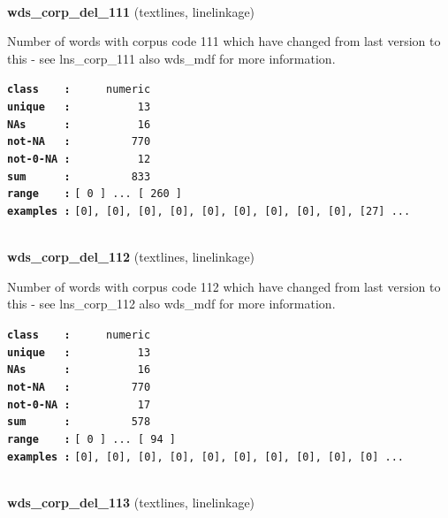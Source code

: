 \documentclass[]{article}
\begin{document}
~

\textbf{wds\_corp\_del\_111} (textlines, linelinkage)

Number of words with corpus code 111 which have changed from last
version to this - see lns\_corp\_111 also wds\_mdf for more information.

\textbf{\texttt{class\ \ \ \ :}} \texttt{~~~~~numeric}\\
\textbf{\texttt{unique\ \ \ :}} \texttt{~~~~~~~~~~13}\\
\textbf{\texttt{NAs\ \ \ \ \ \ :}} \texttt{~~~~~~~~~~16}\\
\textbf{\texttt{not-NA\ \ \ :}} \texttt{~~~~~~~~~770}\\
\textbf{\texttt{not-0-NA\ :}} \texttt{~~~~~~~~~~12}\\
\textbf{\texttt{sum\ \ \ \ \ \ :}} \texttt{~~~~~~~~~833}\\
\textbf{\texttt{range\ \ \ \ :}}
\texttt{{[}\ 0\ {]}\ ...\ {[}\ 260\ {]}}\\
\textbf{\texttt{examples\ :}}
\texttt{{[}0{]},\ {[}0{]},\ {[}0{]},\ {[}0{]},\ {[}0{]},\ {[}0{]},\ {[}0{]},\ {[}0{]},\ {[}0{]},\ {[}27{]}\ ...}\\

~

\textbf{wds\_corp\_del\_112} (textlines, linelinkage)

Number of words with corpus code 112 which have changed from last
version to this - see lns\_corp\_112 also wds\_mdf for more information.

\textbf{\texttt{class\ \ \ \ :}} \texttt{~~~~~numeric}\\
\textbf{\texttt{unique\ \ \ :}} \texttt{~~~~~~~~~~13}\\
\textbf{\texttt{NAs\ \ \ \ \ \ :}} \texttt{~~~~~~~~~~16}\\
\textbf{\texttt{not-NA\ \ \ :}} \texttt{~~~~~~~~~770}\\
\textbf{\texttt{not-0-NA\ :}} \texttt{~~~~~~~~~~17}\\
\textbf{\texttt{sum\ \ \ \ \ \ :}} \texttt{~~~~~~~~~578}\\
\textbf{\texttt{range\ \ \ \ :}}
\texttt{{[}\ 0\ {]}\ ...\ {[}\ 94\ {]}}\\
\textbf{\texttt{examples\ :}}
\texttt{{[}0{]},\ {[}0{]},\ {[}0{]},\ {[}0{]},\ {[}0{]},\ {[}0{]},\ {[}0{]},\ {[}0{]},\ {[}0{]},\ {[}0{]}\ ...}\\

~

\textbf{wds\_corp\_del\_113} (textlines, linelinkage)
\end{document}
